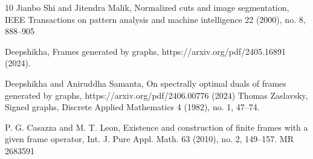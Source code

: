 \documentclass[final,1p,times]{elsarticle}
\begin{document}
\begin{thebibliography}{10}
 Jianbo Shi and Jitendra Malik, Normalized cuts and image segmentation, IEEE Transactions on pattern analysis and machine intelligence 22 (2000), no. 8, 888–905


  Deepshikha, Frames generated by graphs, https://arxiv.org/pdf/2405.16891 (2024).

Deepshikha and Aniruddha Samanta, On spectrally optimal duals of frames generated by graphs,
https://arxiv.org/pdf/2406.00776 (2024)
Thomas Zaslavsky, Signed graphs, Discrete Applied Mathematics 4 (1982), no. 1, 47–74.

 P. G. Casazza and M. T. Leon, Existence and construction of finite frames with a given frame operator, Int. J. Pure
Appl. Math. 63 (2010), no. 2, 149–157. MR 2683591	
	
\end{thebibliography}	
	
	
	
\end{document}
